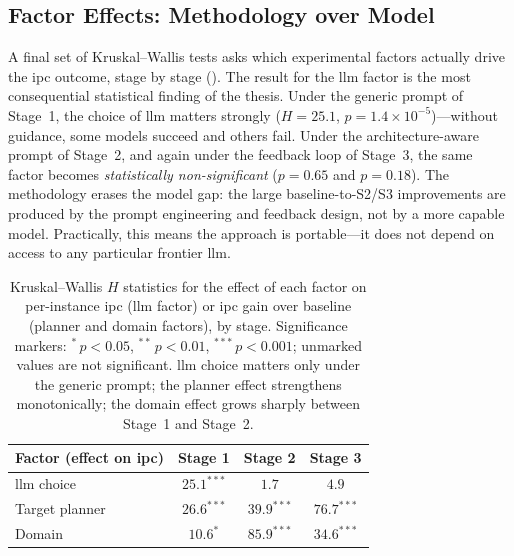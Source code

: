 \subsection{Factor Effects: Methodology over Model}
\label{sec:results:statistical_validation:factors}

A final set of Kruskal--Wallis tests asks which experimental factors actually drive the \gls{ipc} outcome, stage by stage (). The result for the \gls{llm} factor is the most consequential statistical finding of the thesis. Under the generic prompt of Stage~1, the choice of \gls{llm} matters strongly ($H = 25.1$, $p = 1.4 \times 10^{-5}$)---without guidance, some models succeed and others fail. Under the architecture-aware prompt of Stage~2, and again under the feedback loop of Stage~3, the same factor becomes \emph{statistically non-significant} ($p = 0.65$ and $p = 0.18$). The methodology erases the model gap: the large baseline-to-S2/S3 improvements are produced by the prompt engineering and feedback design, not by a more capable model. Practically, this means the approach is portable---it does not depend on access to any particular frontier \gls{llm}.

\begin{table}[htbp]
  \centering
  \caption{Kruskal--Wallis $H$ statistics for the effect of each factor on per-instance \gls{ipc} (\gls{llm} factor) or \gls{ipc} gain over baseline (planner and domain factors), by stage. Significance markers: $^{*}\,p<0.05$, $^{**}\,p<0.01$, $^{***}\,p<0.001$; unmarked values are not significant. \gls{llm} choice matters only under the generic prompt; the planner effect strengthens monotonically; the domain effect grows sharply between Stage~1 and Stage~2.}
  \label{tab:stat_kw}
  \small
  \begin{tabular}{l c c c}
    \toprule
    \textbf{Factor (effect on \gls{ipc})} & \textbf{Stage 1} & \textbf{Stage 2} & \textbf{Stage 3} \\
    \midrule
    \gls{llm} choice   & $25.1^{***}$ & $1.7$       & $4.9$        \\
    Target planner     & $26.6^{***}$ & $39.9^{***}$ & $76.7^{***}$ \\
    Domain             & $10.6^{*}$   & $85.9^{***}$ & $34.6^{***}$ \\
    \bottomrule
  \end{tabular}
\end{table}

